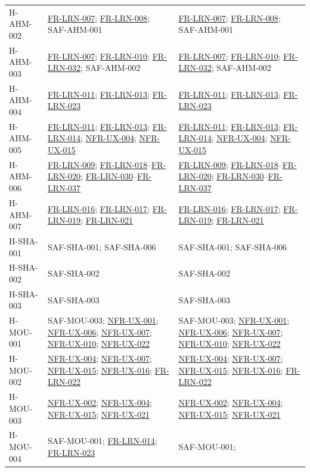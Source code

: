 \documentclass[12pt]{article}
\renewcommand{\_}{\textunderscore\allowbreak}%
\newcommand{\reqref}[1]{\hyperref[req:#1]{#1}}
\begin{document}
{\begin{longtable}{@{}>{\raggedright\arraybackslash}p{}
>{\raggedright\arraybackslash}p{}
>{\raggedright\arraybackslash}p{}@{}}
\addlinespace
H-AHM-002 & \reqref{FR-LRN-007}; \reqref{FR-LRN-008}; SAF-AHM-001 &
\reqref{FR-LRN-007}; \reqref{FR-LRN-008}; SAF-AHM-001 \\
\addlinespace
H-AHM-003 & \reqref{FR-LRN-007}; \reqref{FR-LRN-010}; \reqref{FR-LRN-032}; SAF-AHM-002 &
\reqref{FR-LRN-007}; \reqref{FR-LRN-010}; \reqref{FR-LRN-032}; SAF-AHM-002 \\
\addlinespace
H-AHM-004 & \reqref{FR-LRN-011}; \reqref{FR-LRN-013}; \reqref{FR-LRN-023} &
\reqref{FR-LRN-011}; \reqref{FR-LRN-013}; \reqref{FR-LRN-023} \\
\addlinespace
H-AHM-005 & \reqref{FR-LRN-011}; \reqref{FR-LRN-013}; \reqref{FR-LRN-014};
\reqref{NFR-UX-004}; \reqref{NFR-UX-015} & \reqref{FR-LRN-011};
\reqref{FR-LRN-013}; \reqref{FR-LRN-014}; \reqref{NFR-UX-004};
\reqref{NFR-UX-015} \\
\addlinespace
H-AHM-006 & \reqref{FR-LRN-009}; \reqref{FR-LRN-018}--\reqref{FR-LRN-020}; \reqref{FR-LRN-030}--\reqref{FR-LRN-037} &
\reqref{FR-LRN-009}; \reqref{FR-LRN-018}--\reqref{FR-LRN-020}; \reqref{FR-LRN-030}--\reqref{FR-LRN-037} \\
\addlinespace
H-AHM-007 & \reqref{FR-LRN-016}; \reqref{FR-LRN-017}; \reqref{FR-LRN-019};
\reqref{FR-LRN-021} & \reqref{FR-LRN-016}; \reqref{FR-LRN-017};
\reqref{FR-LRN-019}; \reqref{FR-LRN-021} \\
\addlinespace
H-SHA-001 & SAF-SHA-001; SAF-SHA-006 & SAF-SHA-001; SAF-SHA-006 \\
\addlinespace
H-SHA-002 & SAF-SHA-002 & SAF-SHA-002 \\
\addlinespace
H-SHA-003 & SAF-SHA-003 & SAF-SHA-003 \\
\addlinespace
H-MOU-001 & SAF-MOU-003; \reqref{NFR-UX-001}; \reqref{NFR-UX-006};
\reqref{NFR-UX-007}; \reqref{NFR-UX-010}; \reqref{NFR-UX-022} & SAF-MOU-003;
\reqref{NFR-UX-001}; \reqref{NFR-UX-006}; \reqref{NFR-UX-007};
\reqref{NFR-UX-010}; \reqref{NFR-UX-022} \\
\addlinespace
H-MOU-002 & \reqref{NFR-UX-004}; \reqref{NFR-UX-007}; \reqref{NFR-UX-015};
\reqref{NFR-UX-016}; \reqref{FR-LRN-022} & \reqref{NFR-UX-004};
\reqref{NFR-UX-007}; \reqref{NFR-UX-015}; \reqref{NFR-UX-016};
\reqref{FR-LRN-022} \\
\addlinespace
H-MOU-003 & \reqref{NFR-UX-002}; \reqref{NFR-UX-004}; \reqref{NFR-UX-015};
\reqref{NFR-UX-021} & \reqref{NFR-UX-002}; \reqref{NFR-UX-004};
\reqref{NFR-UX-015}; \reqref{NFR-UX-021} \\
\addlinespace
H-MOU-004 & SAF-MOU-001; \reqref{FR-LRN-014}; \reqref{FR-LRN-023} & SAF-MOU-001;

\end{longtable}}
\end{document}
